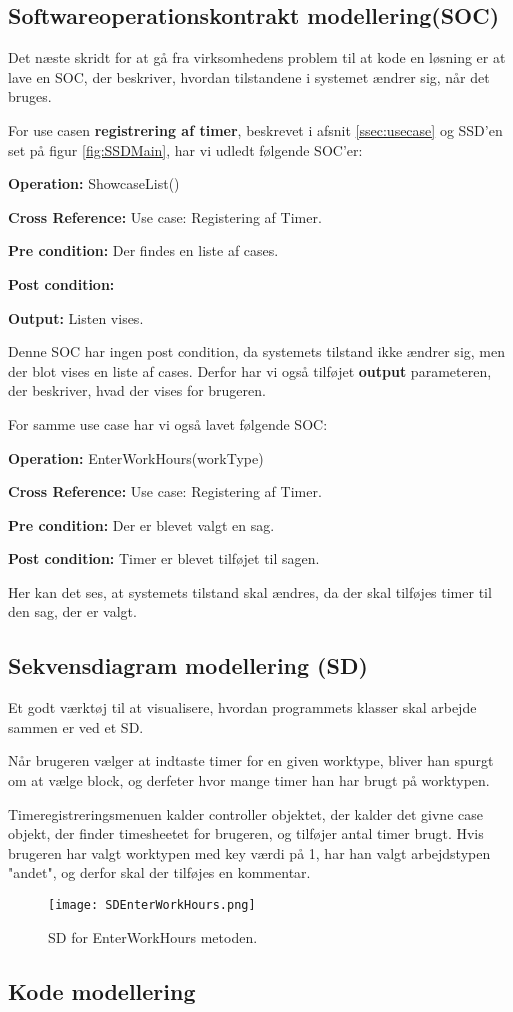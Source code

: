 \subsection{Softwareoperationskontrakt modellering(SOC)}

Det næste skridt for at gå fra virksomhedens problem til at kode en løsning er at lave en SOC, der beskriver, hvordan tilstandene i systemet ændrer sig, når det bruges.

For use casen \textbf{registrering af timer}, beskrevet i afsnit \ref{ssec:usecase} og SSD'en set på figur \ref{fig:SSDMain}, har vi udledt følgende SOC'er:

\textbf{Operation:} ShowcaseList()

\textbf{Cross Reference:} Use case: Registering af Timer.

\textbf{Pre condition:} Der findes en liste af cases.

\textbf{Post condition:}

\textbf{Output:} Listen vises.

Denne SOC har ingen post condition, da systemets tilstand ikke ændrer sig, men der blot vises en liste af cases.
Derfor har vi også tilføjet \textbf{output} parameteren, der beskriver, hvad der vises for brugeren.

For samme use case har vi også lavet følgende SOC:

\textbf{Operation:} EnterWorkHours(workType)

\textbf{Cross Reference:} Use case: Registering af Timer.

\textbf{Pre condition:} Der er blevet valgt en sag.

\textbf{Post condition:} Timer er blevet tilføjet til sagen.

Her kan det ses, at systemets tilstand skal ændres, da der skal tilføjes timer til den sag, der er valgt.

\subsection{Sekvensdiagram modellering (SD)}

Et godt værktøj til at visualisere, hvordan programmets klasser skal arbejde sammen er ved et SD.

Når brugeren vælger at indtaste timer for en given worktype, bliver han spurgt om at vælge block, og derfeter hvor mange timer han har brugt på worktypen.

Timeregistreringsmenuen kalder controller objektet, der kalder det givne case objekt, der finder timesheetet for brugeren, og tilføjer antal timer brugt.
Hvis brugeren har valgt worktypen med key værdi på 1, har han valgt arbejdstypen "andet", og derfor skal der tilføjes en kommentar.
\begin{sidewaysfigure}[h]
    \centering
        \texttt{[image: SDEnterWorkHours.png]}
    \caption{SD for EnterWorkHours metoden.}
    \label{fig:SDEnterWorkHours}
\end{sidewaysfigure}

\subsection{Kode modellering}


